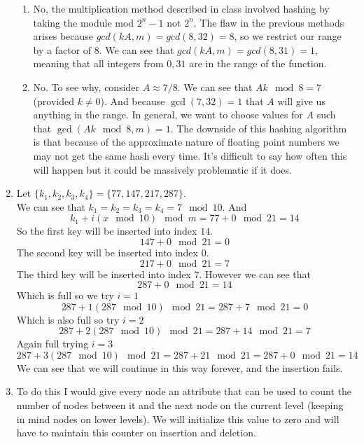 \documentclass[11pt]{article}
\begin{document}
\begin{enumerate}
\begin{enumerate}
			\item No, the multiplication method described in class
				involved hashing by taking the module mod $2^n
				-1$ not $2^n$. The flaw in the previous methods
				arises because $gcd(kA,m) = gcd(8,32) = 8$, so we
				restrict our range by a factor of $8$. We can see
				that $gcd(kA,m) = gcd(8,31) = 1$, meaning that
				all integers from $0,31$ are in the range of
				the function.
			\item No. To see why, consider $A \approx 7/8$. We can
				see that $Ak \mod 8 = 7$ (provided $k \neq 0$). And because
				$\gcd(7,32) = 1$ that $A$ will give us anything in the
				range. In general, we want to choose values for
				$A$ such that $\gcd(Ak \mod 8,m) = 1$. The
				downside of this hashing algorithm is that
				because of the approximate nature of floating
				point numbers we may not get the same hash every
				time. It's difficult to say how often this will
				happen but it could be massively problematic if
				it does.
		\end{enumerate}
	\item Let $\{k_1,k_2,k_3,k_4\} = \{77,147,217,287\}$.\\
		We can see that $k_1=k_2=k_3=k_4= 7 \mod 10$.
		And
		$$k_1 + i(x \mod 10) \mod m = 77 + 0 \mod 21 = 14$$
		So the first key will be inserted into index $14$.
		$$ 147 + 0 \mod 21 = 0$$
		The second key will be inserted into index $0$.
		$$ 217 + 0 \mod 21 = 7$$
		The third key will be inserted into index $7$.
		However we can see that 
		$$ 287 + 0 \mod 21 = 14$$
		Which is full so we try $i = 1$
		$$ 287 + 1(287 \mod 10) \mod 21 = 287 + 7 \mod 21 = 0$$
		Which is also full so try $ i = 2 $
		$$ 287 + 2(287 \mod 10) \mod 21 = 287 + 14 \mod 21 = 7$$
		Again full trying $i = 3$
		$$ 287 + 3(287 \mod 10) \mod 21 = 287 + 21 \mod 21  = 287 + 0
		\mod 21 = 14$$
		We can see that we will continue in this way forever, and the
		insertion fails.
	\item To do this I would give every node an attribute that can be used
		to count the number of nodes between it and the next node on the
		current level (keeping in mind nodes on lower levels). We will
		initialize this value to zero and will have to maintain this 
		counter on insertion and deletion.
\end{enumerate}
\end{document}
